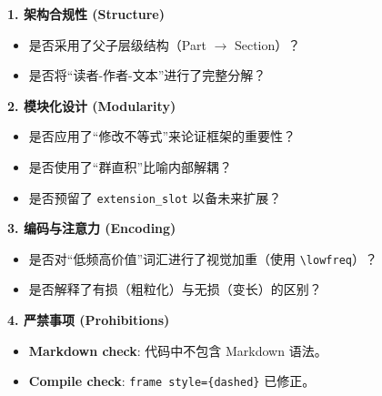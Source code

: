 \documentclass[11pt, a4paper]{article}
\begin{document}
	\begin{checkreport}
		\textbf{1. 架构合规性 (Structure)}
		\begin{itemize}
			\item[$\checkmark$] 是否采用了父子层级结构（Part $\rightarrow$ Section）？
			\item[$\checkmark$] 是否将“读者-作者-文本”进行了完整分解？
		\end{itemize}
		
		\textbf{2. 模块化设计 (Modularity)}
		\begin{itemize}
			\item[$\checkmark$] 是否应用了“修改不等式”来论证框架的重要性？
			\item[$\checkmark$] 是否使用了“群直积”比喻内部解耦？
			\item[$\checkmark$] 是否预留了 \texttt{extension\_slot} 以备未来扩展？
		\end{itemize}
		
		\textbf{3. 编码与注意力 (Encoding)}
		\begin{itemize}
			\item[$\checkmark$] 是否对“低频高价值”词汇进行了视觉加重（使用 \texttt{\textbackslash lowfreq}）？
			\item[$\checkmark$] 是否解释了有损（粗粒化）与无损（变长）的区别？
		\end{itemize}
		
		\textbf{4. 严禁事项 (Prohibitions)}
		\begin{itemize}
			\item[$\checkmark$] \textbf{Markdown check}: 代码中不包含 Markdown 语法。
			\item[$\checkmark$] \textbf{Compile check}: \texttt{frame style=\{dashed\}} 已修正。
		\end{itemize}
	\end{checkreport}
	
\end{document}
